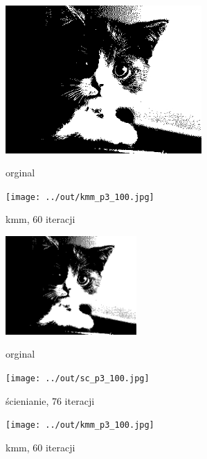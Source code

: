 \documentclass[a4paper,12pt]{article}
\begin{document}
\begin{figure}[h!]
\begin{minipage}[t]{7.5cm}
\begin{center}
\includegraphics[width=7.5cm]{../in/p3.jpg}
\caption{orginal}
\end{center}
\end{minipage}
\hfill
\begin{minipage}[t]{7.5cm}
\begin{center}
\texttt{[image: ../out/kmm\_p3\_100.jpg]}
\caption{kmm, 60 iteracji}
\end{center}
\end{minipage}
\end{figure}

\begin{figure}[h!]
\begin{minipage}[t]{5cm}
\begin{center}
\includegraphics[width=5cm]{../in/p3.jpg}
\caption{orginal}
\end{center}
\end{minipage}
\hfill
\begin{minipage}[t]{5cm}
\begin{center}
\texttt{[image: ../out/sc\_p3\_100.jpg]}
\caption{ścienianie, 76 iteracji}
\end{center}
\end{minipage}
\hfill
\begin{minipage}[t]{5cm}
\begin{center}
\texttt{[image: ../out/kmm\_p3\_100.jpg]}
\caption{kmm, 60 iteracji}
\end{center}
\end{minipage}
\end{figure}
\end{document}
